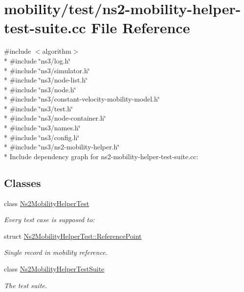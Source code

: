 \hypertarget{ns2-mobility-helper-test-suite_8cc}{}\section{mobility/test/ns2-\/mobility-\/helper-\/test-\/suite.cc File Reference}
\label{ns2-mobility-helper-test-suite_8cc}
{\ttfamily \#include $<$algorithm$>$}\\*
{\ttfamily \#include \char`\"{}ns3/log.\+h\char`\"{}}\\*
{\ttfamily \#include \char`\"{}ns3/simulator.\+h\char`\"{}}\\*
{\ttfamily \#include \char`\"{}ns3/node-\/list.\+h\char`\"{}}\\*
{\ttfamily \#include \char`\"{}ns3/node.\+h\char`\"{}}\\*
{\ttfamily \#include \char`\"{}ns3/constant-\/velocity-\/mobility-\/model.\+h\char`\"{}}\\*
{\ttfamily \#include \char`\"{}ns3/test.\+h\char`\"{}}\\*
{\ttfamily \#include \char`\"{}ns3/node-\/container.\+h\char`\"{}}\\*
{\ttfamily \#include \char`\"{}ns3/names.\+h\char`\"{}}\\*
{\ttfamily \#include \char`\"{}ns3/config.\+h\char`\"{}}\\*
{\ttfamily \#include \char`\"{}ns3/ns2-\/mobility-\/helper.\+h\char`\"{}}\\*
Include dependency graph for ns2-\/mobility-\/helper-\/test-\/suite.cc\+:
\subsection*{Classes}
\begin{DoxyCompactItemize}
\item 
class \hyperlink{classNs2MobilityHelperTest}{Ns2\+Mobility\+Helper\+Test}
\begin{DoxyCompactList}\small\item\em Every test case is supposed to\+: \end{DoxyCompactList}\item 
struct \hyperlink{structNs2MobilityHelperTest_1_1ReferencePoint}{Ns2\+Mobility\+Helper\+Test\+::\+Reference\+Point}
\begin{DoxyCompactList}\small\item\em Single record in mobility reference. \end{DoxyCompactList}\item 
class \hyperlink{classNs2MobilityHelperTestSuite}{Ns2\+Mobility\+Helper\+Test\+Suite}
\begin{DoxyCompactList}\small\item\em The test suite. \end{DoxyCompactList}\end{DoxyCompactItemize}

